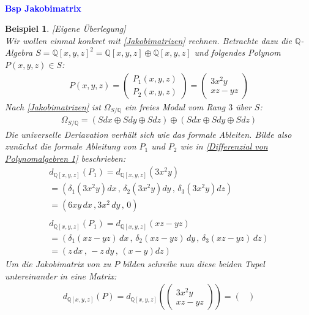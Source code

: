 \documentclass[10pt,a4paper]{report}
\newcounter{Aussage}[chapter]
\newtheorem{bsp}[Aussage]{Beispiel}
\newcommand{\divR}[2]{\Omega_{#1/#2}}
\newcommand{\divf}[1]{d_{#1}}
\begin{document}
\ \\
\textcolor{blue}{\textbf{Bsp Jakobimatrix}}
\begin{bsp}\label{Bsp Jakobimatrix} \textit{[Eigene Überlegung]}\\
Wir wollen einmal konkret mit \cref{Jakobimatrizen} rechnen. Betrachte dazu die $\mathbb{Q}$-Algebra $ S = \mathbb{Q}[x,y,z]^2 = \mathbb{Q}[x,y,z] \oplus \mathbb{Q}[x,y,z]$ und folgendes Polynom $P(x,y,z) \in S$:
\begin{gather*}
 P(x,y,z) = 
\begin{pmatrix}
P_1(x,y,z)\\
P_2(x,y,z)
\end{pmatrix}
=
\begin{pmatrix}
3x^2y\\
xz-yz
\end{pmatrix}
\end{gather*}
Nach \cref{Jakobimatrizen} ist $\divR{S}{\mathbb{Q}}$ ein freies Modul vom Rang $3$ über $S$:
\begin{gather*}
\divR{S}{\mathbb{Q}} = \left( Sdx \oplus Sdy \oplus Sdz \right) \oplus \left( Sdx \oplus Sdy \oplus Sdz \right)
\end{gather*}
Die universelle Deriavation verhält sich wie das formale Ableiten. Bilde also zunächst die formale Ableitung von $P_1$ und $P_2$ wie in \cref{Differenzial von Polynomalgebren 1} beschrieben:
\begin{gather*}
\divf{\mathbb{Q}[x,y,z]}(P_1)
= \divf{\mathbb{Q}[x,y,z]}(3x^2y)\\
=(\delta_1(3x^2y)dx \, , \, \delta_2(3x^2y) dy \, , \, \delta_3(3x^2y) dz)\\
=(6xy \, dx \, , 3x^2  \,dy \, , \,0)\\
\ \\
\divf{\mathbb{Q}[x,y,z]}(P_1)
= \divf{\mathbb{Q}[x,y,z]}(xz - yz)\\
= (\delta_1(xz - yz) \, dx \, , \, \delta_2(xz - yz) \, dy \, , \, \delta_3(xz - yz) \, dz)\\
= (z \, dx \, , \, -z \, dy \, , \, (x - y)dz)
\end{gather*}
Um die Jakobimatrix von zu $P$ bilden schreibe nun diese beiden Tupel untereinander in eine Matrix:
\begin{gather*}
\divf{\mathbb{Q}[x,y,z]}(P)
= \divf{\mathbb{Q}[x,y,z]}\left(
\begin{pmatrix}
3x^2y\\
xz-yz
\end{pmatrix}
\right)
= 
\begin{pmatrix}

\end{pmatrix}
\end{gather*}
\end{bsp}
\end{document}
